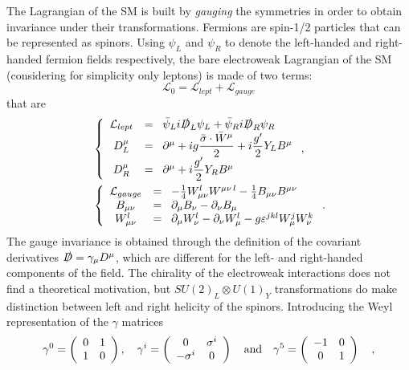 The Lagrangian of the SM is built by {\it gauging} the symmetries in 
order to obtain invariance under their transformations.
Fermions are spin-1/2 particles that can be represented as spinors.
Using $\psi_{L}$ and 
$\psi_{R}$ to denote the left-handed and right-handed fermion fields 
respectively, 
the bare electroweak Lagrangian of the SM (considering 
for simplicity only leptons) is made of two terms:
\begin{equation}\label{eq:bareLagSM}
\mathcal{L}_{0} = \mathcal{L}_{lept}+ \mathcal{L}_{gauge}
\end{equation}
that are 
\begin{align}
&\left \{ \begin{array}{cl}
\mathcal{L}_{lept} &=\;\;  \bar\psi_{L}i\slashed{D}_{L}\psi_{L} + \bar\psi_{R}i\slashed{D}_{R}\psi_{R}\\
D_{L}^{\mu} &=\;\;  \partial^{\mu} + ig\dfrac{\bar{\sigma}\cdot\bar{W}^{\mu}}{2} + i\dfrac{g'}{2}Y_{L}B^{\mu}\\
D_{R}^{\mu} &=\;\;  \partial^{\mu} + i\dfrac{g'}{2}Y_{R}B^{\mu}
\end{array} \right. ,\label{eq:lagLep} \\
&\left \{ \begin{array}{cl}
\mathcal{L}_{gauge}  &=\;\;  -\frac{1}{4}W_{\mu\nu}^{l}W^{\mu\nu\, l}  -\frac{1}{4}B_{\mu\nu}B^{\mu\nu}\\
B_{\mu\nu} &=\;\;  \partial_{\mu}B_{\nu} - \partial_{\nu}B_{\mu}\\
W_{\mu\nu}^{l} &=\;\;  \partial_{\mu}W_{\nu}^{l} - \partial_{\nu}W_{\mu}^{l} - g\varepsilon^{jkl}W_{\mu}^{j}W_{\nu}^{k}
\end{array} \right. .\label{eq:lagGauge}
\end{align}
The gauge invariance is obtained through the definition of the
covariant derivatives $\slashed{D} = \gamma_{\mu}D^{\mu}$, 
which are different for the left- and
right-handed components of the field.
The chirality of the electroweak interactions does not find 
a theoretical motivation, but $SU(2)_{L} \otimes U(1)_{Y}$ transformations 
do make distinction between left and right helicity of the spinors.
Introducing the Weyl representation of the $\gamma$ matrices
\begin{equation}
\gamma^{0} = \left(\begin{array}{cc} 0 & 1 \\ 1 & 0 \\ \end{array}\right), \quad
\gamma^{i} = \left(\begin{array}{cc} 0 & \sigma^{i} \\ -\sigma^{i} & 0 \\ \end{array}\right) \quad \textnormal{and} \quad
\gamma^{5} = \left(\begin{array}{cc} -1 & 0 \\ 0 & 1 \\ \end{array}\right) \quad ,
\end{equation}
